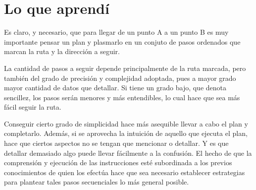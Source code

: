 \documentclass{article}
\begin{document}
\section{Lo que aprendí}

Es claro, y necesario, que para llegar de un punto A a un punto B es muy importante pensar un plan y plasmarlo en un conjuto de pasos ordenados que marcan la ruta y la dirección a seguir. 

La cantidad de pasos a seguir depende principalmente de la ruta marcada, pero también del grado de precisión y complejidad adoptada, pues a mayor grado mayor cantidad de datos que detallar. Si tiene un grado bajo, que denota sencillez, los pasos serán menores y más entendibles, lo cual hace que sea más fácil seguir la ruta. 

Conseguir cierto grado de simplicidad hace más asequible llevar a cabo el plan y completarlo. Además, si se aprovecha la intuición de aquello que ejecuta el plan, hace que ciertos aspectos no se tengan que mencionar o detallar. Y es que detallar demasiado algo puede llevar fácilmente a la confusión. El hecho de que la comprensión y ejecución de las instrucciones esté subordinada a los previos conocimientos de quien los efectúa hace que sea necesario establecer estrategias para plantear tales pasos secuenciales lo más general posible.   
\end{document}
